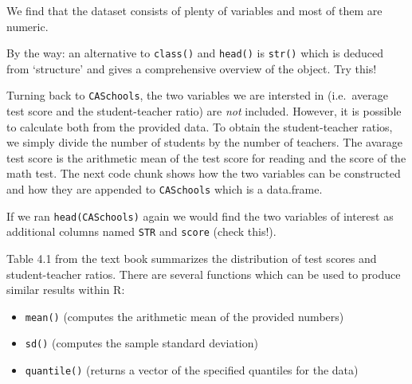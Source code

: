 \documentclass[]{book}
\newenvironment{Shaded}{\begin{snugshade}}{\end{snugshade}}
\newcommand{\DecValTok}[1]{\textcolor[rgb]{0.00,0.00,0.81}{#1}}
\newcommand{\StringTok}[1]{\textcolor[rgb]{0.31,0.60,0.02}{#1}}
\newcommand{\CommentTok}[1]{\textcolor[rgb]{0.56,0.35,0.01}{\textit{#1}}}
\newcommand{\OperatorTok}[1]{\textcolor[rgb]{0.81,0.36,0.00}{\textbf{#1}}}
\newcommand{\NormalTok}[1]{#1}
\theoremstyle{definition}
\theoremstyle{definition}
\theoremstyle{definition}
\theoremstyle{remark}
\begin{document}
We find that the dataset consists of plenty of variables and most of
them are numeric.

By the way: an alternative to \texttt{class()} and \texttt{head()} is
\texttt{str()} which is deduced from `structure' and gives a
comprehensive overview of the object. Try this!

Turning back to \texttt{CASchools}, the two variables we are intersted
in (i.e.~average test score and the student-teacher ratio) are
\emph{not} included. However, it is possible to calculate both from the
provided data. To obtain the student-teacher ratios, we simply divide
the number of students by the number of teachers. The avarage test score
is the arithmetic mean of the test score for reading and the score of
the math test. The next code chunk shows how the two variables can be
constructed and how they are appended to \texttt{CASchools} which is a
data.frame.

\begin{Shaded}
\end{Shaded}

If we ran \texttt{head(CASchools)} again we would find the two variables
of interest as additional columns named \texttt{STR} and \texttt{score}
(check this!).

Table 4.1 from the text book summarizes the distribution of test scores
and student-teacher ratios. There are several functions which can be
used to produce similar results within R:

\begin{itemize}
\item
  \texttt{mean()} (computes the arithmetic mean of the provided numbers)
\item
  \texttt{sd()} (computes the sample standard deviation)
\item
  \texttt{quantile()} (returns a vector of the specified quantiles for
  the data)
\end{itemize}
\end{document}
